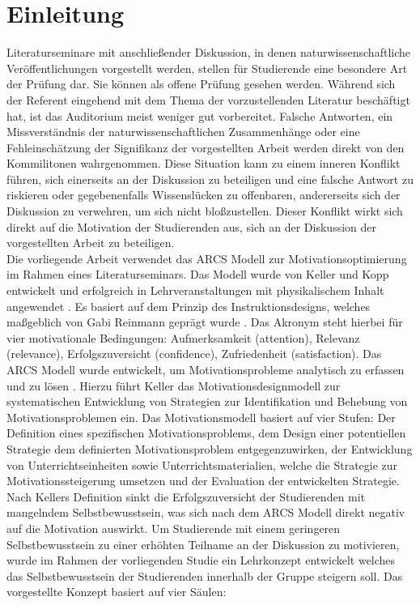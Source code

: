 \section{Einleitung}
Literaturseminare mit anschließender Diskussion, in denen naturwissenschaftliche Veröffentlichungen vorgestellt werden, stellen für Studierende eine besondere Art der Prüfung dar. Sie können als offene Prüfung gesehen werden. Während sich der Referent eingehend mit dem Thema der vorzustellenden Literatur beschäftigt hat, ist das Auditorium meist weniger gut vorbereitet. Falsche Antworten, ein Missverständnis der naturwissenschaftlichen Zusammenhänge oder eine
Fehleinschätzung der Signifikanz der vorgestellten Arbeit werden direkt von den Kommilitonen wahrgenommen. Diese Situation kann zu einem inneren Konflikt führen, sich einerseits an der Diskussion zu beteiligen und eine falsche Antwort zu riskieren oder gegebenenfalls Wissenslücken zu offenbaren, andererseits sich der Diskussion zu verwehren, um sich nicht bloßzustellen. Dieser Konflikt wirkt sich direkt auf die Motivation der Studierenden aus, sich an der Diskussion der vorgestellten Arbeit zu beteiligen.\\
\noindent
Die vorliegende Arbeit verwendet das ARCS Modell zur Motivationsoptimierung im Rahmen eines Literaturseminars. Das Modell wurde von Keller und Kopp \cite{M.Keller.1987} entwickelt und erfolgreich in Lehrveranstaltungen mit physikalischem Inhalt angewendet \cite{AsksoyG.2016}. Es basiert auf dem Prinzip des Instruktionsdesigns, welches maßgeblich von Gabi Reinmann geprägt wurde \cite{reinmann2011instructional}. Das Akronym steht hierbei für vier motivationale Bedingungen: Aufmerksamkeit (attention), Relevanz (relevance), Erfolgszuversicht (confidence), Zufriedenheit (satisfaction). Das ARCS Modell wurde entwickelt, um Motivationsprobleme analytisch zu erfassen und zu lösen \cite{Keller.1987}. Hierzu führt Keller das Motivationsdesignmodell zur systematischen Entwicklung von Strategien zur Identifikation und Behebung von Motivationsproblemen ein. Das Motivationsmodell basiert auf vier Stufen: Der Definition eines spezifischen Motivationsproblems, dem Design einer potentiellen Strategie dem definierten Motivationsproblem entgegenzuwirken, der Entwicklung von Unterrichtseinheiten sowie Unterrichtsmaterialien, welche die Strategie zur Motivationssteigerung umsetzen und der Evaluation der entwickelten Strategie.\\
\noindent
Nach Kellers Definition sinkt die Erfolgszuversicht der Studierenden mit mangelndem Selbstbewusstsein, was sich nach dem ARCS Modell direkt negativ auf die Motivation auswirkt. Um Studierende mit einem geringeren Selbstbewusstsein zu einer erhöhten Teilname an der Diskussion zu motivieren, wurde im Rahmen der vorliegenden Studie ein Lehrkonzept entwickelt welches das Selbstbewusstsein der Studierenden innerhalb der Gruppe steigern soll. Das vorgestellte  Konzept basiert auf vier Säulen:
